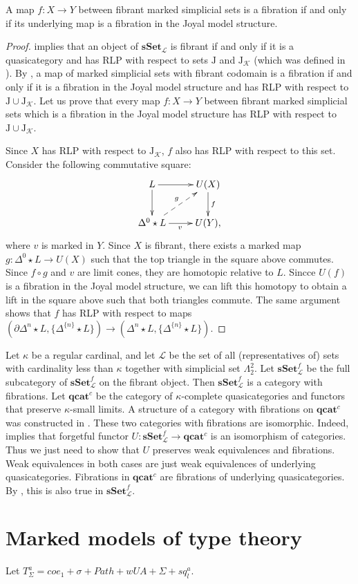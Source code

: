 \documentclass[reqno]{amsart}
\theoremstyle{definition}
\theoremstyle{remark}
\newcommand{\cat}[1]{\mathbf{#1}}
\newcommand{\sSet}{\cat{sSet}}
\newcommand{\qcat}{\cat{qcat}}
\newcommand{\join}{\star}
\newcommand{\J}{\mathrm{J}}
\numberwithin{figure}{section}
\begin{document}
\begin{prop}
A map $f : X \to Y$ between fibrant marked simplicial sets is a fibration if and only if its underlying map is a fibration in the Joyal model structure.
\end{prop}
\begin{proof}
 implies that an object of $\sSet_\mathcal{L}$ is fibrant if and only if it is a quasicategory
and has RLP with respect to sets $\J$ and $\J_\mathcal{K}$ (which was defined in ).
By \cite[Proposition~3.6]{f-model-structures}, a map of marked simplicial sets with fibrant codomain is a fibration
if and only if it is a fibration in the Joyal model structure and has RLP with respect to $\J \cup \J_\mathcal{K}$.
Let us prove that every map $f : X \to Y$ between fibrant marked simplicial sets which is a fibration in the Joyal model structure has RLP with respect to $\J \cup \J_\mathcal{K}$.

Since $X$ has RLP with respect to $\J_\mathcal{K}$, $f$ also has RLP with respect to this set.
Consider the following commutative square:
\[ \xymatrix{ L \ar[r] \ar[d] & U(X) \ar[d]^f \\
              \Delta^0 \join L \ar[r]_v \ar@{-->}[ur]^g & U(Y),
            } \]
where $v$ is marked in $Y$.
Since $X$ is fibrant, there exists a marked map $g : \Delta^0 \join L \to U(X)$ such that the top triangle in the square above commutes.
Since $f \circ g$ and $v$ are limit cones, they are homotopic relative to $L$.
Sincce $U(f)$ is a fibration in the Joyal model structure, we can lift this homotopy to obtain a lift in the square above such that both triangles commute.
The same argument shows that $f$ has RLP with respect to maps $(\partial \Delta^n \join L, \{ \Delta^{\{n\}} \join L \}) \to (\Delta^n \join L, \{ \Delta^{\{n\}} \join L \})$.
\end{proof}

Let $\kappa$ be a regular cardinal, and let $\mathcal{L}$ be the set of all (representatives of) sets with cardinality less than $\kappa$ together with simplicial set $\Lambda^2_2$.
Let $\sSet_\mathcal{L}^f$ be the full subcategory of $\sSet_\mathcal{L}^f$ on the fibrant object.
Then $\sSet_\mathcal{L}^f$ is a category with fibrations.
Let $\qcat^c$ be the category of $\kappa$-complete quasicategories and functors that preserve $\kappa$-small limits.
A structure of a category with fibrations on $\qcat^c$ was constructed in \cite{szumilo}.
These two categories with fibrations are isomorphic.
Indeed,  implies that forgetful functor $U : \sSet_\mathcal{L}^f \to \qcat^c$ is an isomorphism of categories.
Thus we just need to show that $U$ preserves weak equivalences and fibrations.
Weak equivalences in both cases are just weak equivalences of underlying quasicategories.
Fibrations in $\qcat^c$ are fibrations of underlying quasicategories.
By , this is also true in $\sSet_\mathcal{L}^f$.

\section{Marked models of type theory}

Let $T^a_\Sigma = coe_1 + \sigma + Path + wUA + \Sigma + sq^a_l$.



\end{document}
